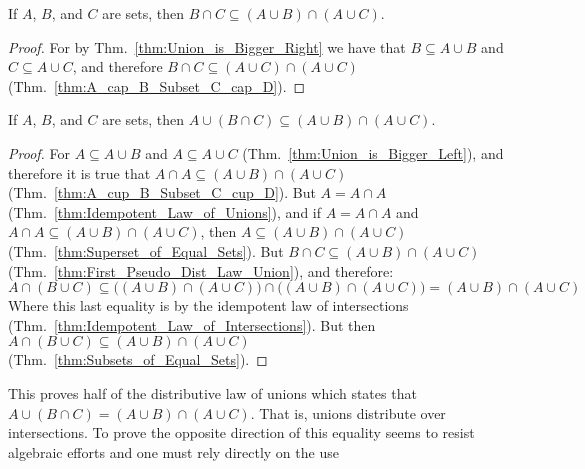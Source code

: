         \begin{theorem}
            \label{thm:First_Pseudo_Dist_Law_Union}%
            If $A$, $B$, and $C$ are sets, then
            $B\cap{C}\subseteq(A\cup{B})\cap(A\cup{C})$.
        \end{theorem}
        \begin{proof}
            For by Thm.~\ref{thm:Union_is_Bigger_Right} we have that
            $B\subseteq{A}\cup{B}$ and $C\subseteq{A}\cup{C}$, and therefore
            $B\cap{C}\subseteq(A\cup{C})\cap(A\cup{C})$
            (Thm.~\ref{thm:A_cap_B_Subset_C_cap_D}).
        \end{proof}
        \begin{theorem}
            \label{thm:Second_Pseudo_Dist_Law_Union}%
            If $A$, $B$, and $C$ are sets, then
            $A\cup(B\cap{C})\subseteq(A\cup{B})\cap(A\cup{C})$.
        \end{theorem}
        \begin{proof}
            For $A\subseteq{A}\cup{B}$ and $A\subseteq{A}\cup{C}$
            (Thm.~\ref{thm:Union_is_Bigger_Left}), and therefore it is true that
            $A\cap{A}\subseteq(A\cup{B})\cap(A\cup{C})$
            (Thm.~\ref{thm:A_cup_B_Subset_C_cup_D}). But $A=A\cap{A}$
            (Thm.~\ref{thm:Idempotent_Law_of_Unions}), and if
            $A=A\cap{A}$ and $A\cap{A}\subseteq(A\cup{B})\cap(A\cup{C})$, then
            $A\subseteq(A\cup{B})\cap(A\cup{C})$
            (Thm.~\ref{thm:Superset_of_Equal_Sets}). But
            $B\cap{C}\subseteq(A\cup{B})\cap(A\cup{C})$
            (Thm.~\ref{thm:First_Pseudo_Dist_Law_Union}), and therefore:
            \begin{equation}
                A\cap(B\cup{C})\subseteq
                \big((A\cup{B})\cap(A\cup{C})\big)\cap
                \big((A\cup{B})\cap(A\cup{C})\big)
                =(A\cup{B})\cap(A\cup{C})
            \end{equation}
            Where this last equality is by the idempotent law of intersections
            (Thm.~\ref{thm:Idempotent_Law_of_Intersections}). But then
            $A\cap(B\cup{C})\subseteq(A\cup{B})\cap(A\cup{C})$
            (Thm.~\ref{thm:Subsets_of_Equal_Sets}).
        \end{proof}
        This proves half of the distributive law of unions which states that
        $A\cup(B\cap{C})=(A\cup{B})\cap(A\cup{C})$. That is, unions distribute
        over intersections. To prove the opposite direction of this equality
        seems to resist algebraic efforts and one must rely directly on the use
